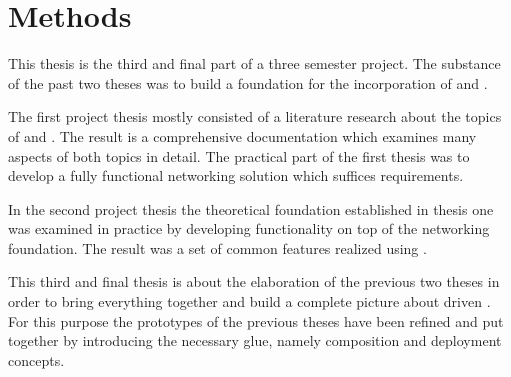 \chapter{Methods}

This thesis is the third and final part of a three semester project. The
substance of the past two theses was to build a foundation for the incorporation
of \mss{} and \ogs{}. 

The first project thesis \cite{biedermann2015project1} mostly consisted of a
literature research about the topics of \ogs{} and \mss{}. The result is a
comprehensive documentation which examines many aspects of both topics in
detail. The practical part of the first thesis was to develop a fully functional
\ms{} networking solution which suffices \og{} requirements.

In the second project thesis \cite{biedermann2016project2} the theoretical
foundation established in thesis one was examined in practice by developing
\og{} functionality on top of the networking foundation. The result was a set of
common \og{} features realized using \mss{}.

This third and final thesis is about the elaboration of the previous two theses
in order to bring everything together and build a complete picture about
\ms{} driven \ogs{}. For this purpose the prototypes of the previous theses have
been refined and put together by introducing the necessary glue, namely \ms{}
composition and deployment concepts.




















